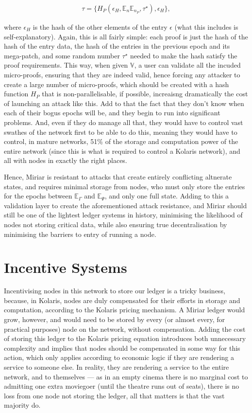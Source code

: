 \documentclass{extreport}
\begin{document}
\begin{align*}
\tau = \{ H_P(\epsilon_H, \mathbb{E}_n \mathbb{E}_{n_P}, \tau^\star), \epsilon_H \},
\end{align*}

where \(\epsilon_H\) is the hash of the other elements of the entry \(\epsilon\) (what this includes is self-explanatory). Again, this is all fairly simple: each proof is just the hash of the hash of the entry data, the hash of the entries in the previous epoch and its mega-patch, and some random number \(\tau^\star\) needed to make the hash satisfy the proof requirements. This way, when given \(\mathbb{V}\), a user can validate all the incuded micro-proofs, ensuring that they are indeed valid, hence forcing any attacker to create a large number of micro-proofs, which should be created with a hash function \(H_P\) that is non-parallelisable, if possible, increaisng dramatically the cost of launching an attack like this. Add to that the fact that they don't know when each of their bogus epochs will be, and they begin to run into significant problems. And, even if they do manage all that, they would have to control vast swathes of the network first to be able to do this, meaning they would have to control, in mature networks, 51\% of the storage and computation power of the entire network (since this is what is required to control a Kolaris network), and all with nodes in exactly the right places.

Hence, Miriar is resistant to attacks that create entirely conflicting altnerate states, and requires minimal storage from nodes, who must only store the entries for the epochs between \(\mathbb{E}_\Gamma\) and \(\mathbb{E}_\Psi\), and only one full state. Adding to this a validation layer to create the aforementioned attack resistance, and Miriar should still be one of the lightest ledger systems in history, minimising the likelihood of nodes not storing critical data, while also ensuring true decentralisation by minimising the barriers to entry of running a node.

\chapter{Incentive Systems}
\label{sec:org66e610c}

Incentivising nodes in this network to store our ledger is a tricky business, because, in Kolaris, nodes are duly compensated for their efforts in storage and computation, according to the Kolaris pricing mechanism. A Miriar ledger would grow, however, and would need to be stored by every (or almost every, for practical purposes) node on the network, without compensation. Adding the cost of storing this ledger to the Kolaris pricing equation introduces both unnecessary complexity and implies that nodes should be compensated in some way for this action, which only applies according to economic logic if they are rendering a service to someone else. In reality, they are rendering a service to the entire network, and to themselves --- as in an empty cinema there is no marginal cost to admitting one extra moviegoer (until the theatre runs out of seats), there is no loss from one node not storing the ledger, all that matters is that the vast majority do.
\end{document}

